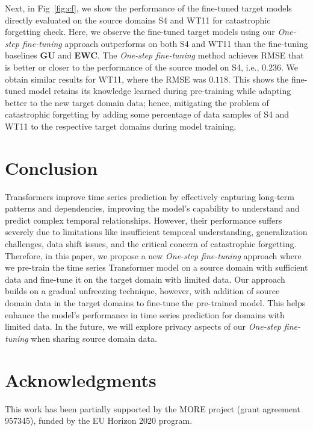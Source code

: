 \documentclass[letterpaper]{article} %
\begin{document}
Next, in Fig~\ref{fig:cf}, we show the performance of the fine-tuned target models directly evaluated on the source domains S4 and WT11 for catastrophic forgetting check. Here, we observe the fine-tuned target models using our \emph{One-step fine-tuning} approach outperforms on both S4 and WT11 than the fine-tuning baselines \textbf{GU} and \textbf{EWC}. The \emph{One-step fine-tuning} method achieves RMSE that is better or closer to the performance of the source model on S4, i.e., $0.236$. We obtain similar results for WT11, where the RMSE was $0.118$. This shows the fine-tuned model retains its knowledge learned during pre-training while adapting better to the new target domain data; hence, mitigating the problem of catastrophic forgetting by adding some percentage of data samples of S4 and WT11 to the respective target domains during model training.

\section{Conclusion}
Transformers improve time series prediction by effectively capturing long-term patterns and dependencies, improving the model's capability to understand and predict complex temporal relationships. However, their performance suffers severely due to limitations like insufficient temporal understanding, generalization challenges, data shift issues, and the critical concern of catastrophic forgetting. Therefore, in this paper, we propose a new \emph{One-step fine-tuning} approach where we pre-train the time series Transformer model on a source domain with sufficient data and fine-tune it on the target domain with limited data. Our approach builds on a gradual unfreezing technique, however, with addition of source domain data in the target domains to fine-tune the pre-trained model. This helps enhance the model's performance in time series prediction for domains with limited data. In the future, we will explore privacy aspects of our \emph{One-step fine-tuning} when sharing source domain data.

\section{Acknowledgments}
This work has been partially supported by the MORE project (grant agreement 957345), funded by the EU Horizon 2020 program.

\clearpage

\end{document}
